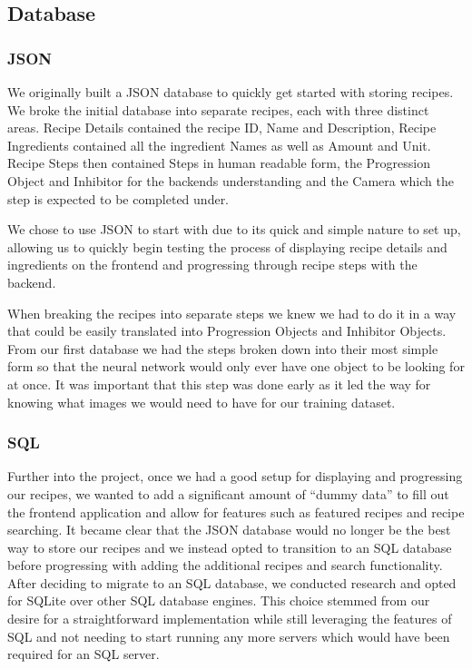 \documentclass{article}
\begin{document}
 
    \subsection{Database}
    \subsubsection{JSON}
    We originally built a JSON database to quickly get started with storing recipes. We broke the initial database into separate recipes, each with three distinct areas. Recipe Details contained the recipe ID, Name and Description, Recipe Ingredients contained all the ingredient Names as well as Amount and Unit. Recipe Steps then contained Steps in human readable form, the Progression Object and Inhibitor for the backends understanding and the Camera which the step is expected to be completed under.
    
    We chose to use JSON to start with due to its quick and simple nature to set up, allowing us to quickly begin testing the process of displaying recipe details and ingredients on the frontend and progressing through recipe steps with the backend.
    
    When breaking the recipes into separate steps we knew we had to do it in a way that could be easily translated into Progression Objects and Inhibitor Objects. From our first database we had the steps broken down into their most simple form so that the neural network would only ever have one object to be looking for at once. It was important that this step was done early as it led the way for knowing what images we would need to have for our training dataset.
    \subsubsection{SQL}
    Further into the project, once we had a good setup for displaying and progressing our recipes, we wanted to add a significant amount of “dummy data” to fill out the frontend application and allow for features such as featured recipes and recipe searching. It became clear that the JSON database would no longer be the best way to store our recipes and we instead opted to transition to an SQL database before progressing with adding the additional recipes and search functionality.
    After deciding to migrate to an SQL database, we conducted research and opted for SQLite over other SQL database engines. This choice stemmed from our desire for a straightforward implementation while still leveraging the features of SQL and not needing to start running any more servers which would have been required for an SQL server.
    
\end{document}
